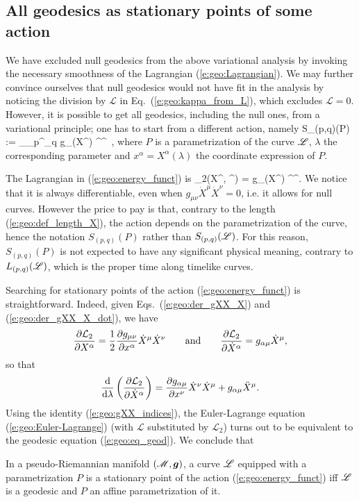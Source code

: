 \subsection{All geodesics as stationary points of some action} \label{s:geo:all_geod}

We have excluded null geodesics from the above variational analysis by
invoking the necessary smoothness of the Lagrangian (\ref{e:geo:Lagrangian}).
We may further convince ourselves that null geodesics would not have fit
in the analysis by noticing the division by $\mathcal{L}$ in Eq.~(\ref{e:geo:kappa_from_L}),
which excludes $\mathcal{L} = 0$.
However, it is possible to get all geodesics, including the null ones, from
a variational principle; one has to start from a different action, namely
\be \label{e:geo:energy_funct}
    S_{(p,q)}(P) := \int_{\lambda_p}^{\lambda_q}
        g_{\mu\nu}(X^\rho) ^\mu {}^\nu \, \D\lambda ,
\ee
where $P$ is a parametrization of the curve $\mathscr{L}$, $\lambda$
the corresponding parameter
and $x^\alpha = X^\alpha(\lambda)$ the coordinate expression of $P$.

The Lagrangian in (\ref{e:geo:energy_funct}) is
\be \label{e:geo:Lagrangian2}
   _2(X^\alpha, ^\alpha) =  
        g_{\mu\nu}(X^\rho) ^\mu {}^\nu  .
\ee
We notice that it is always differentiable, even
when $g_{\mu\nu}\dot{X}^\mu \dot{X}^\nu  = 0$, i.e. it allows for null curves.
However the price to pay is that,
contrary to the length (\ref{e:geo:def_length_X}),
the action depends on the parametrization of the curve,
hence the notation $S_{(p,q)}(P)$ rather than $S_{(p,q)}(\mathscr{L})$.
For this reason, $S_{(p,q)}(P)$ is not expected to have any significant
physical meaning, contrary to $L_{(p,q)}(\mathscr{L})$, which is the proper
time along timelike curves.

Searching for stationary points of the action
(\ref{e:geo:energy_funct}) is straightforward. Indeed,
given Eqs.~(\ref{e:geo:der_gXX_X}) and (\ref{e:geo:der_gXX_X_dot}),
we have
\[
    \frac{\partial \mathcal{L}_2}{\partial X^\alpha} = \frac{1}{2}
        \frac{\partial g_{\mu\nu}}{\partial x^\alpha}  \dot{X}^\mu \dot{X}^\nu
    \qquad\mbox{and}\qquad
    \frac{\partial \mathcal{L}_2}{\partial \dot{X}^\alpha} = g_{\alpha\mu} \dot{X}^\mu ,
\]
so that
\[
    \frac{\mathrm{d}}{\mathrm{d}\lambda}\left( \frac{\partial \mathcal{L}_2}{\partial \dot{X}^\alpha}\right) =
      \frac{\partial g_{\alpha\mu}}{\partial x^\nu} \dot{X}^\nu \dot{X}^\mu
      + g_{\alpha\mu} \ddot{X}^\mu .
\]
Using the identity (\ref{e:geo:gXX_indices}), the Euler-Lagrange equation
(\ref{e:geo:Euler-Lagrange}) (with $\mathcal{L}$ substituted by $\mathcal{L}_2$)
turns out to be equivalent to the geodesic equation (\ref{e:geo:eq_geod}).
We conclude that
\begin{greybox}
In a pseudo-Riemannian manifold $(\mathscr{M},\bm{g})$, a
curve $\mathscr{L}$ equipped with a parametrization $P$
is a stationary point of the action (\ref{e:geo:energy_funct})
iff $\mathscr{L}$ is a geodesic and $P$ an affine parametrization of it.
\end{greybox}

